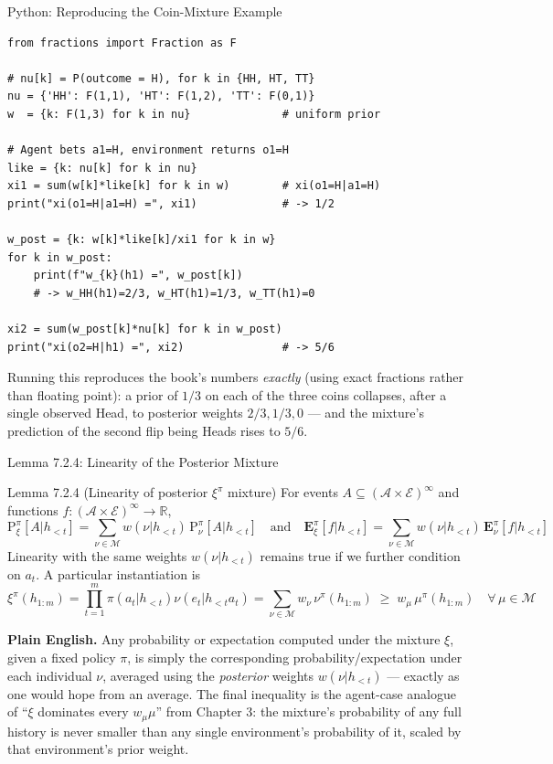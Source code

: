 \documentclass[aspectratio=169,10pt]{beamer}
\newcommand{\R}{\mathbb{R}}
\newcommand{\Mcal}{\mathcal{M}}
\newcommand{\Acal}{\mathcal{A}}
\newcommand{\Ecal}{\mathcal{E}}
\begin{document}
\begin{frame}[fragile]{Python: Reproducing the Coin-Mixture Example}
  \begin{lstlisting}
from fractions import Fraction as F

# nu[k] = P(outcome = H), for k in {HH, HT, TT}
nu = {'HH': F(1,1), 'HT': F(1,2), 'TT': F(0,1)}
w  = {k: F(1,3) for k in nu}              # uniform prior

# Agent bets a1=H, environment returns o1=H
like = {k: nu[k] for k in nu}
xi1 = sum(w[k]*like[k] for k in w)        # xi(o1=H|a1=H)
print("xi(o1=H|a1=H) =", xi1)             # -> 1/2

w_post = {k: w[k]*like[k]/xi1 for k in w}
for k in w_post:
    print(f"w_{k}(h1) =", w_post[k])
    # -> w_HH(h1)=2/3, w_HT(h1)=1/3, w_TT(h1)=0

xi2 = sum(w_post[k]*nu[k] for k in w_post)
print("xi(o2=H|h1) =", xi2)               # -> 5/6
  \end{lstlisting}
  Running this reproduces the book's numbers \emph{exactly} (using exact
  fractions rather than floating point): a prior of $1/3$ on each of the
  three coins collapses, after a single observed Head, to posterior weights
  $2/3, 1/3, 0$ --- and the mixture's prediction of the second flip being
  Heads rises to $5/6$.
\end{frame}

\begin{frame}{Lemma 7.2.4: Linearity of the Posterior Mixture}
  \begin{block}{Lemma 7.2.4 (Linearity of posterior $\xi^\pi$ mixture)}
    For events $A\subseteq(\Acal\times\Ecal)^\infty$ and functions
    $f:(\Acal\times\Ecal)^\infty\to\R$,
    \[
      \mathrm{P}_\xi^\pi[A|h_{<t}] = \sum_{\nu\in\Mcal} w(\nu|h_{<t})\,
      \mathrm{P}_\nu^\pi[A|h_{<t}]
      \quad\text{and}\quad
      \mathbf{E}_\xi^\pi[f|h_{<t}] = \sum_{\nu\in\Mcal} w(\nu|h_{<t})\,
      \mathbf{E}_\nu^\pi[f|h_{<t}]
    \]
    Linearity with the same weights $w(\nu|h_{<t})$ remains true if we
    further condition on $a_t$. A particular instantiation is
    \[
      \xi^\pi(h_{1:m}) = \prod_{t=1}^m\pi(a_t|h_{<t})\nu(e_t|h_{<t}a_t)
      = \sum_{\nu\in\Mcal} w_\nu\,\nu^\pi(h_{1:m}) \;\ge\; w_\mu\,\mu^\pi(h_{1:m})
      \quad\forall\,\mu\in\Mcal
    \]
  \end{block}
  \textbf{Plain English.} Any probability or expectation computed under the
  mixture $\xi$, given a fixed policy $\pi$, is simply the corresponding
  probability/expectation under each individual $\nu$, averaged using the
  \emph{posterior} weights $w(\nu|h_{<t})$ --- exactly as one would hope
  from an average. The final inequality is the agent-case analogue of
  ``$\xi$ dominates every $w_\mu\mu$'' from Chapter 3: the mixture's
  probability of any full history is never smaller than any single
  environment's probability of it, scaled by that environment's prior
  weight.
\end{frame}
\end{document}
